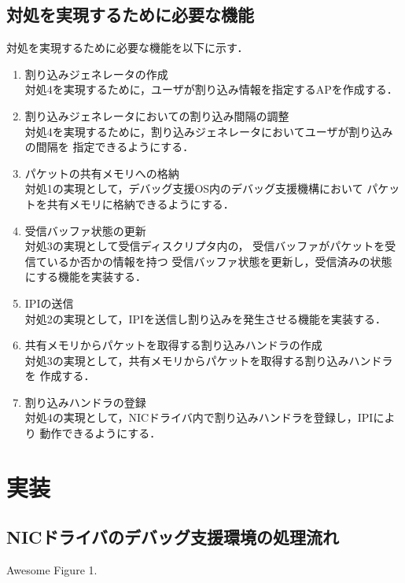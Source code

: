 \documentclass[tanilab-enum]{graduate}
\begin{document}
\section{対処を実現するために必要な機能}
対処を実現するために必要な機能を以下に示す．
\begin{enumerate}
    \item 割り込みジェネレータの作成\\
        対処4を実現するために，ユーザが割り込み情報を指定するAPを作成する．
    \item 割り込みジェネレータにおいての割り込み間隔の調整\\
        対処4を実現するために，割り込みジェネレータにおいてユーザが割り込みの間隔を
        指定できるようにする．
    \item パケットの共有メモリへの格納\\
        対処1の実現として，デバッグ支援OS内のデバッグ支援機構において
        パケットを共有メモリに格納できるようにする．
    \item 受信バッファ状態の更新\\
        対処3の実現として受信ディスクリプタ内の，
        受信バッファがパケットを受信ているか否かの情報を持つ
        受信バッファ状態を更新し，受信済みの状態にする機能を実装する．
    \item IPIの送信\\
        対処2の実現として，IPIを送信し割り込みを発生させる機能を実装する．
    \item 共有メモリからパケットを取得する割り込みハンドラの作成\\
        対処3の実現として，共有メモリからパケットを取得する割り込みハンドラを
        作成する．
    \item 割り込みハンドラの登録\\
        対処4の実現として，NICドライバ内で割り込みハンドラを登録し，IPIにより
        動作できるようにする．
\end{enumerate}


\chapter{実装}\label{chap:implementation}
\section{NICドライバのデバッグ支援環境の処理流れ}
{Awesome Figure 1.}
\end{document}
